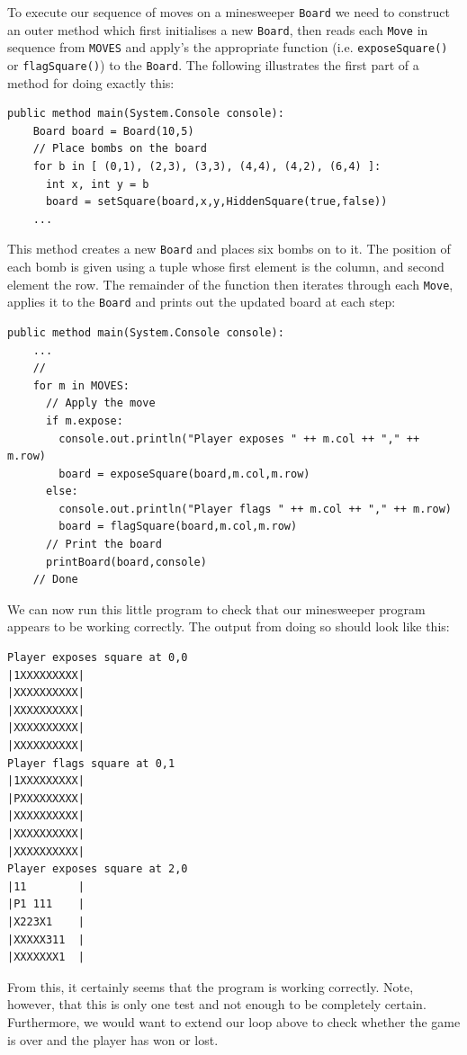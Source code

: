 To execute our sequence of moves on a minesweeper \lstinline{Board} we need to construct an outer method which first initialises a new \lstinline{Board}, then reads each \lstinline{Move} in sequence from \lstinline{MOVES} and apply's the appropriate function (i.e. \lstinline{exposeSquare()} or \lstinline{flagSquare()}) to the \lstinline{Board}.  The following illustrates the first part of a method for doing exactly this:
\begin{lstlisting}
public method main(System.Console console):
    Board board = Board(10,5)
    // Place bombs on the board
    for b in [ (0,1), (2,3), (3,3), (4,4), (4,2), (6,4) ]:
      int x, int y = b
      board = setSquare(board,x,y,HiddenSquare(true,false))
    ...
\end{lstlisting}

This method creates a new \lstinline{Board} and places six bombs on to it.  The position of each bomb is given using a tuple whose first element is the column, and second element the row.  The remainder of the function then iterates through each \lstinline{Move}, applies it to the \lstinline{Board} and prints out the updated board at each step:

\begin{lstlisting}
public method main(System.Console console):
    ...
    //
    for m in MOVES:
      // Apply the move
      if m.expose:
        console.out.println("Player exposes " ++ m.col ++ "," ++ m.row)
        board = exposeSquare(board,m.col,m.row)
      else:
        console.out.println("Player flags " ++ m.col ++ "," ++ m.row)
        board = flagSquare(board,m.col,m.row)
      // Print the board
      printBoard(board,console)
    // Done
\end{lstlisting}

We can now run this little program to check that our minesweeper program appears to be working correctly.  The output from doing so should look like this:

\begin{lstlisting}
Player exposes square at 0,0
|1XXXXXXXXX|
|XXXXXXXXXX|
|XXXXXXXXXX|
|XXXXXXXXXX|
|XXXXXXXXXX|
Player flags square at 0,1
|1XXXXXXXXX|
|PXXXXXXXXX|
|XXXXXXXXXX|
|XXXXXXXXXX|
|XXXXXXXXXX|
Player exposes square at 2,0
|11        |
|P1 111    |
|X223X1    |
|XXXXX311  |
|XXXXXXX1  |
\end{lstlisting}
From this, it certainly seems that the program is working correctly.  Note, however, that this is only one test and not enough to be completely certain.  Furthermore, we would want to extend our loop above to check whether the game is over and the player has won or lost.
